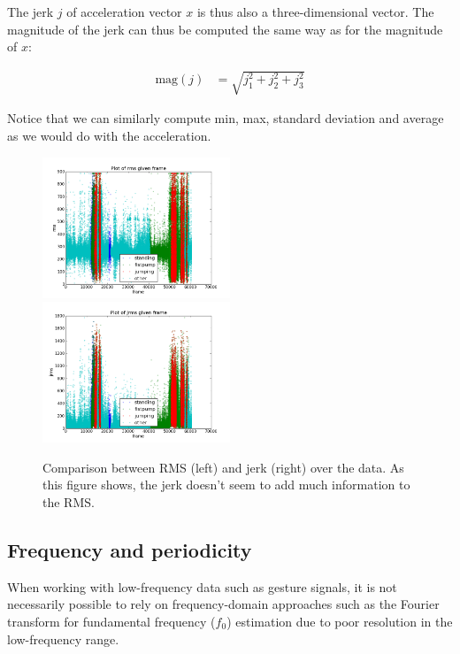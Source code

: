 \documentclass{article}
\begin{document}
The jerk $j$ of acceleration vector $x$ is thus also a three-dimensional vector. The magnitude of the jerk can thus be computed the same way as for the magnitude of $x$:

\begin{align}
\textrm{mag}(j) &= \sqrt{j_1^2 + j_2^2 + j_3^2}
\end{align}

Notice that we can similarly compute min, max, standard deviation and average as we would do with the acceleration.

\begin{figure}
\includegraphics[width=0.5\textwidth]{images/plot--frame-rms--all--jumping_fistpump_standing.png}
\includegraphics[width=0.5\textwidth]{images/plot--frame-jrms--all--jumping_fistpump_standing.png}
\caption{Comparison between RMS (left) and jerk (right) over the data. As this figure shows, the jerk doesn't seem to add much information to the RMS.}
\label{rmsvsjerkf0}
\end{figure}

\subsection{Frequency and periodicity}

When working with low-frequency data such as gesture signals, it is
not necessarily possible to rely on frequency-domain approaches such
as the Fourier transform for fundamental frequency ($f_0$) estimation
due to poor resolution in the low-frequency range.
\end{document}
